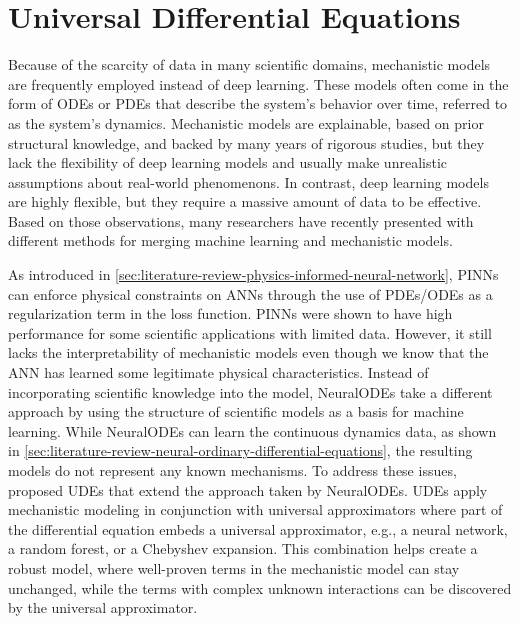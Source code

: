 \section{Universal Differential Equations}

Because of the scarcity of data in many scientific domains, mechanistic models are frequently employed instead of deep learning.
These models often come in the form of \glspl{ODE} or \glspl{PDE} that describe the system's behavior over time, referred to as the system's dynamics.
Mechanistic models are explainable, based on prior structural knowledge, and backed by many years of rigorous studies, but they lack the flexibility of deep learning models and usually make unrealistic assumptions about real-world phenomenons.
In contrast, deep learning models are highly flexible, but they require a massive amount of data to be effective.
Based on those observations, many researchers have recently presented with different methods for merging machine learning and mechanistic models.

As introduced in \autoref{sec:literature-review-physics-informed-neural-network}, \glspl{PINN} can enforce physical constraints on \glspl{ANN} through the use of \glspl{PDE}/\glspl{ODE} as a regularization term in the loss function.
\glspl{PINN} were shown to have high performance for some scientific applications with limited data.
However, it still lacks the interpretability of  mechanistic models even though we know that the \gls{ANN} has learned some legitimate physical characteristics.
Instead of incorporating scientific knowledge into the model, \glspl{NeuralODE} take a different approach by using the structure of scientific models as a basis for machine learning.
While \glspl{NeuralODE} can learn the continuous dynamics data, as shown in \autoref{sec:literature-review-neural-ordinary-differential-equations}, the resulting models do not represent any known mechanisms.
To address these issues, \citeauthor{rackauckasUniversalDifferentialEquations2020} \cite{rackauckasUniversalDifferentialEquations2020} proposed \glspl{UDE} that extend the approach taken by \glspl{NeuralODE}.
\glspl{UDE} apply mechanistic modeling in conjunction with universal approximators where part of the differential equation embeds a universal approximator, e.g., a neural network, a random forest, or a Chebyshev expansion.
This combination helps create a robust model, where well-proven terms in the mechanistic model can stay unchanged, while the terms with complex unknown interactions can be discovered by the universal approximator.

